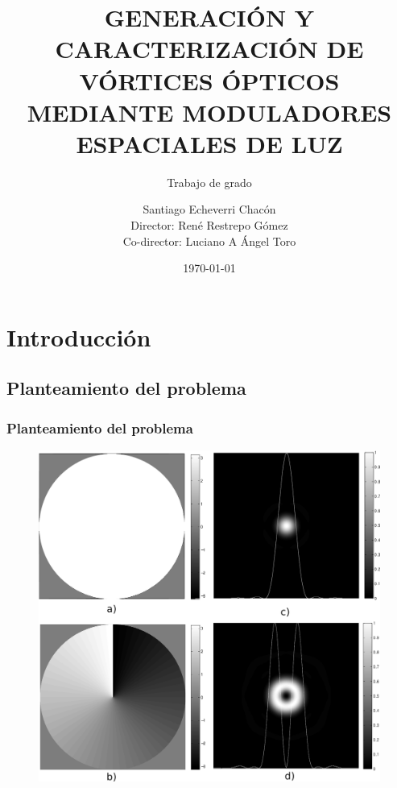 \documentclass[xcolor=table,serif]{beamer}
\date{\today}
\author[]{Santiago Echeverri Chac\'on\\ Director: René Restrepo
  Gómez\\Co-director: Luciano A Ángel Toro}
\title[Trabajo de grado]{GENERACIÓN Y CARACTERIZACIÓN DE VÓRTICES
                  ÓPTICOS MEDIANTE MODULADORES ESPACIALES DE LUZ}
\subtitle{Trabajo de grado}
\institute{Universidad EAFIT}
\begin{document}
\begin{frame}
\titlepage
\end{frame}
\AtBeginSection[]
{
 \begin{frame}
   \frametitle{Contenido}
   \footnotesize 
   \tableofcontents[currentsection]%
   \normalsize
\end{frame}
}

\section{Introducción}
\subsection{Planteamiento del problema}
\begin{frame}
\frametitle{Planteamiento del problema}
\begin{figure}
  \includegraphics[scale = 0.3]{Figures/ch2_img/oam_Intro.pdf}
  \end{figure}
\end{frame}
\addtocounter{framenumber}{-1}
\end{document}
